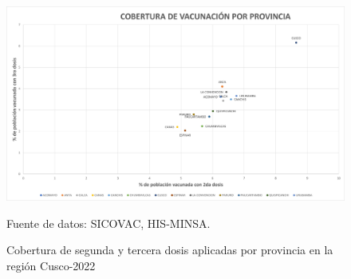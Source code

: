 \documentclass[12pt,a4paper,openany]{book}
\begin{document}
	\begin{landscape}
		\begin{figure}[ht]
			\caption{Cobertura de segunda y tercera dosis aplicadas por provincia en la región Cusco-2022}\label{fig:Cobertura_Vacunacion_Provincias}
			\begin{center}
				\includegraphics[width=0.90\linewidth]{../sala_covid/../sala_nacional/Cobertura_Vacunacion_Provincias.jpg}
			\end{center}
			{\footnotesize {Fuente de datos: SICOVAC, HIS-MINSA.}}
		\end{figure}
	\end{landscape}
	
\end{document}
